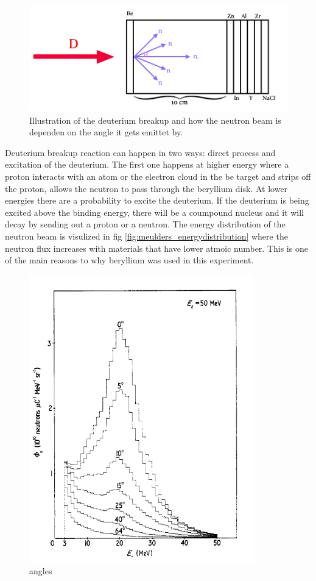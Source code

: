 \documentclass[twoside,english]{uiofysmaster/uiofysmaster}
\begin{document}
\begin{figure} [h!]
   \centering
   \includegraphics[width=1\linewidth]{D_to_n}
   \caption{Illustration of the deuterium breakup and how the neutron beam is dependen on the angle it gets emittet by.}
   \label{fig:D_to_n}
\end{figure}
\noindent
Deuterium breakup reaction can happen in two ways: direct process and excitation of the deuterium. The first one happens at higher energy where a proton interacts with an atom or the  electron cloud in the be target and strips off the proton, allows the neutron to pass through the beryllium disk.  At lower energies there are a probability to excite the deuterium. If the deuterium is being excited above the binding energy, there will be a coumpound nucleus and it will decay by sending out a proton or a neutron. The energy distribution of the neutron beam is visulized in fig \ref{fig:meulders_energydistribution} where the neutron flux increases with materials that have lower atmoic number. This is one of the main reasons to why beryllium was used in this experiment.

\begin{figure} [h!]
   \centering
   \includegraphics[width=.6\linewidth ]{zero_degrees_moulder.png}
   \caption{angles}
   \label{fig:angles_moulder}
\end{figure}
\noindent
\end{document}
